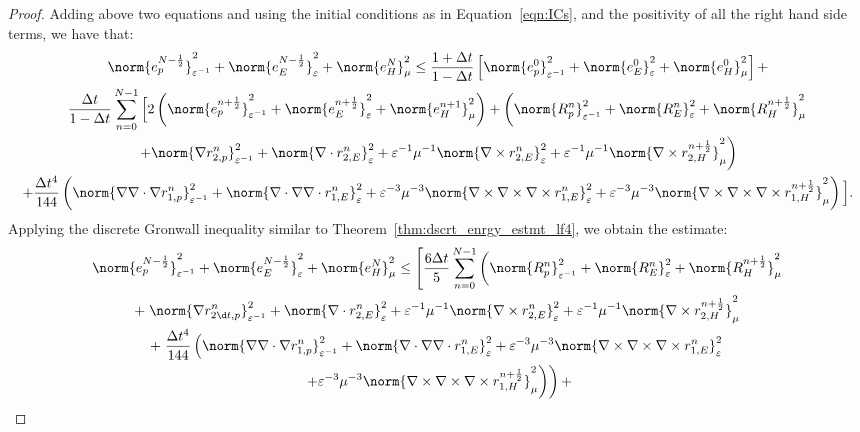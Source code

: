 \documentclass{amsart}
\theoremstyle{thmstyleone}%
\theoremstyle{thmstyletwo}%
\theoremstyle{thmstylethree}%
\begin{document}
\begin{proof}
Adding above two equations and using the initial conditions as in Equation~\eqref{eqn:ICs}, and the positivity of all the right hand side terms, we have that:
\begin{multline*}
  \norm{e_p^{N - \frac{1}{2}}}^2_{\varepsilon^{-1}} + \norm{e_E^{N - \frac{1}{2}}}^2_{\varepsilon} + \norm{e_H^N}^2_{\mu} \le \dfrac{1 + \Delta t}{1 - \Delta t} \left[ \norm{e_p^0}^2_{\varepsilon^{-1}} + \norm{e_E^0}^2_{\varepsilon} + \norm{e_H^0}^2_{\mu} \right] + \\
  \dfrac{\Delta t}{1 - \Delta t} \sum\limits_{n = 0}^{N - 1} \Big[ 2 \left( \norm{e_p^{n + \frac{1}{2}}}^2_{\varepsilon^{-1}} + \norm{e_E^{n + \frac{1}{2}}}^2_{\varepsilon} + \norm{e_H^{n + 1}}^2_{\mu} \right) + \left( \norm{R_p^n}^2_{\varepsilon^{-1}} + \norm{R_E^n}^2_{\varepsilon} + \norm{R_H^{n + \frac{1}{2}}}^2_{\mu} \right. \\ \left.
+ \norm{\nabla r_{2,p}^n} ^2_{\varepsilon^{-1}} + \norm{\nabla \cdot r_{2,E}^n}^2_{\varepsilon} + \varepsilon^{-1} \mu^{-1} \norm{\nabla \times r_{2,E}^n}^2_{\varepsilon} +  \varepsilon^{-1} \mu^{-1} \norm{\nabla \times r_{2,H}^{n + \frac{1}{2}}}^2_{\mu} \right) \\ 
+ \dfrac{\Delta t^4}{144} \left( \norm{\nabla \nabla \cdot \nabla r_{1,p}^n} ^2_{\varepsilon^{-1}} + \norm{\nabla \cdot \nabla \nabla \cdot r_{1,E}^n}^2_{\varepsilon} + \varepsilon^{-3} \mu^{-3} \norm{\nabla \times \nabla \times \nabla \times r_{1,E}^n}^2_{\varepsilon} +  \varepsilon^{-3} \mu^{-3} \norm{\nabla \times \nabla \times \nabla \times r_{1,H}^{n + \frac{1}{2}}}^2_{\mu} \right) \Big].
\end{multline*}
Applying the discrete Gronwall inequality similar to Theorem~\ref{thm:dscrt_enrgy_estmt_lf4}, we obtain the estimate:
\begin{multline*}
  \norm{e_p^{N - \frac{1}{2}}}^2_{\varepsilon^{-1}} + \norm{e_E^{N - \frac{1}{2}}}^2_{\varepsilon} +\norm{e_H^N}^2_{\mu} \le \Bigg[ \dfrac{6 \Delta t}{5} \sum\limits_{n = 0}^{N - 1} \left(\norm{R_p^n}^2_{\varepsilon^{-1}} + \norm{R_E^n}^2_{\varepsilon} + \norm{R_H^{n + \frac{1}{2}}}^2_{\mu} \right. \\ + \left. \norm{\nabla r_{2ṭ,p}^n} ^2_{\varepsilon^{-1}} + \norm{\nabla \cdot r_{2,E}^n}^2_{\varepsilon} + \varepsilon^{-1} \mu^{-1} \norm{\nabla \times r_{2,E}^n}^2_{\varepsilon} +  \varepsilon^{-1} \mu^{-1} \norm{\nabla \times r_{2,H}^{n + \frac{1}{2}}}^2_{\mu} \right. \\ 
+ \left. \dfrac{\Delta t^4}{144} \left( \norm{\nabla \nabla \cdot \nabla r_{1,p}^n} ^2_{\varepsilon^{-1}} + \norm{\nabla \cdot \nabla \nabla \cdot r_{1,E}^n}^2_{\varepsilon} + \varepsilon^{-3} \mu^{-3} \norm{\nabla \times \nabla \times \nabla \times r_{1,E}^n}^2_{\varepsilon} \right. \right. \\  \left. \left. +  \varepsilon^{-3} \mu^{-3} \norm{\nabla \times \nabla \times \nabla \times r_{1,H}^{n + \frac{1}{2}}}^2_{\mu} \right)  \right) +

\end{multline*}
\end{proof}
\end{document}
